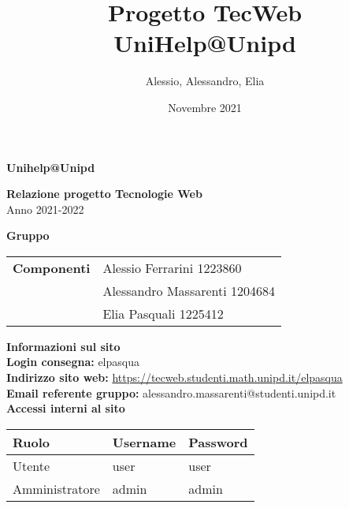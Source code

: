 \documentclass[a4paper, 11pt]{article}
\title{Progetto TecWeb \\ UniHelp@Unipd}
\author{Alessio, Alessandro, Elia}
\date{Novembre 2021}
\begin{document}
\begin{center}
	\textbf{\Huge{Unihelp@Unipd}}\\
\end{center}

\vspace{1.5cm}

\begin{center}
	\textbf{\huge{Relazione progetto Tecnologie Web}}\\[0.2cm]
	\Large{Anno 2021-2022}
\end{center}

\vspace{5pt}

\begin{center}
	\textbf{\Large{Gruppo}}
    \begin{table}[H]
        \hspace{3.5cm}
        \renewcommand{\arraystretch}{1.4}
        \begin{tabular}{l | l}
            \textbf{Componenti} & Alessio Ferrarini 1223860\\
            & Alessandro Massarenti 1204684\\
            & Elia Pasquali 1225412\\
        \end{tabular}
    \end{table}
\end{center}

\hspace{5pt}

\begin{center}
	\textbf{\Large{Informazioni sul sito}}\\
	\textbf{Login consegna:} elpasqua \\
	\textbf{Indirizzo sito web:} \url{https://tecweb.studenti.math.unipd.it/elpasqua}\\
	\textbf{Email referente gruppo:} alessandro.massarenti@studenti.unipd.it\\
    \vspace{1cm}
    \textbf{Accessi interni al sito}
    \begin{longtable}{|l|l|l|}
        \hline
        \rowcolor[HTML]{9B0014}
        {\color[HTML]{FFFFFF} Ruolo} & {\color[HTML]{FFFFFF} Username} & {\color[HTML]{FFFFFF} Password} \\ \hline
        Utente         & user     & user     \\ \hline
        Amministratore & admin    & admin \\ \hline
    \end{longtable}
\end{center}

\pagebreak
\tableofcontents
\pagebreak







\end{document}
